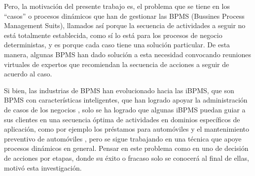 Pero, la motivación del presente trabajo es, el problema que se tiene en los ``casos'' o procesos dinámicos que han de gestionar las BPMS (Bussines Process Management Suits), llamados así porque la secuencia de actividades a seguir no está totalmente establecida, como sí lo está para los procesos de negocio deterministas, y es porque cada caso tiene una solución particular. De esta manera, algunas BPMS han dado solución a esta necesidad convocando reuniones virtuales de expertos que recomiendan la secuencia de acciones a seguir de acuerdo al caso.

Si bien, las industrias de BPMS han evolucionado hacia las iBPMS, que son BPMS con características inteligentes, que han logrado apoyar la administración de casos de los negocios \citep{frece2012bpm}, solo se ha logrado que algunas iBPMS puedan guiar a sus clientes en una secuencia óptima de actividades en dominios específicos de aplicación, como por ejemplo los préstamos para automóviles \citep{lakshmanan2010predictive} y el mantenimiento preventivo de automóviles \citep{khoshafian2015digital}, pero se sigue trabajando en una técnica que apoye procesos dinámicos en general. Pensar en este problema como en uno de decisión de acciones por etapas, donde su éxito o fracaso solo se conocerá al final de ellas, motivó esta investigación.



